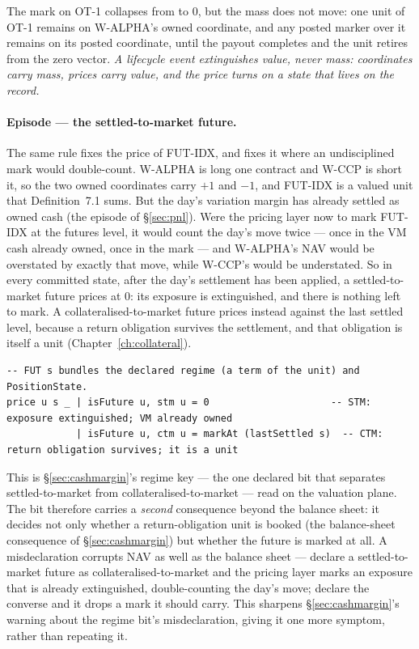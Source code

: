 The mark on OT-1 collapses from  to $0$, but the mass does not
move: one unit of OT-1 remains on W-ALPHA's owned coordinate, and any posted
marker over it remains on its posted coordinate, until the payout completes and
the unit retires from the zero vector. \emph{A lifecycle event extinguishes
value, never mass: coordinates carry mass, prices carry value, and the price
turns on a state that lives on the record.}

\paragraph{Episode --- the settled-to-market future.}
The same rule fixes the price of FUT-IDX, and fixes it where an undisciplined
mark would double-count. W-ALPHA is long one contract and W-CCP is short it, so
the two owned coordinates carry $+1$ and $-1$, and FUT-IDX is a valued unit that
Definition~7.1 sums. But the day's variation margin has already settled as owned
cash (the episode of \S\ref{sec:pnl}). Were the pricing layer now to mark FUT-IDX
at the futures level, it would count the day's move twice --- once in the VM cash
already owned, once in the mark --- and W-ALPHA's NAV would be overstated by
exactly that move, while W-CCP's would be understated. So in every committed
state, after the day's settlement has been applied, a settled-to-market future
prices at $0$: its exposure is extinguished, and there is nothing left to mark.
A collateralised-to-market future prices instead against the last settled level,
because a return obligation survives the settlement, and that obligation is itself
a unit (Chapter~\ref{ch:collateral}).

\begin{lstlisting}
-- FUT s bundles the declared regime (a term of the unit) and PositionState.
price u s _ | isFuture u, stm u = 0                     -- STM: exposure extinguished; VM already owned
            | isFuture u, ctm u = markAt (lastSettled s)  -- CTM: return obligation survives; it is a unit
\end{lstlisting}

This is \S\ref{sec:cashmargin}'s regime key --- the one declared bit that
separates settled-to-market from collateralised-to-market --- read on the
valuation plane. The bit therefore carries a \emph{second} consequence beyond
the balance sheet: it decides not only whether a return-obligation unit is booked
(the balance-sheet consequence of \S\ref{sec:cashmargin}) but whether the future
is marked at all. A misdeclaration corrupts NAV as well as the balance sheet ---
declare a settled-to-market future as collateralised-to-market and the pricing
layer marks an exposure that is already extinguished, double-counting the day's
move; declare the converse and it drops a mark it should carry. This sharpens
\S\ref{sec:cashmargin}'s warning about the regime bit's misdeclaration, giving it
one more symptom, rather than repeating it.

